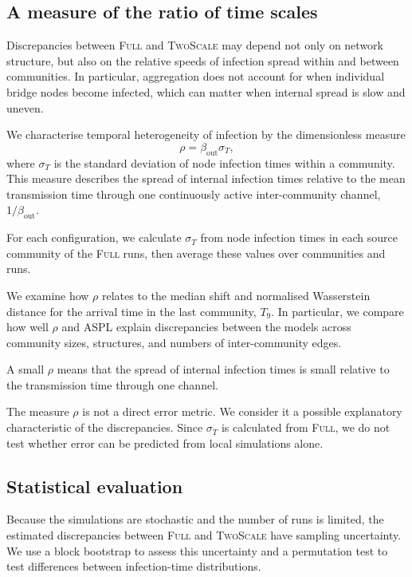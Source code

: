 \documentclass[a4paper,fleqn]{cas-sc}
\newcommand{\Full}{\textup{\textsc{Full}}}
\newcommand{\TS}{\textup{\textsc{TwoScale}}}
\begin{document}
\subsection{A measure of the ratio of time scales}
\label{sec:descriptor}

Discrepancies between \Full{} and \TS{} may depend not only on network structure, but also on the relative speeds of infection spread within and between communities. In particular, aggregation does not account for when individual bridge nodes become infected, which can matter when internal spread is slow and uneven.

We characterise temporal heterogeneity of infection by the dimensionless measure
\begin{equation}
\label{eq:rho}
\rho=\beta_{\mathrm{out}}\sigma_T,
\end{equation}
where $\sigma_T$ is the standard deviation of node infection times within a community. This measure describes the spread of internal infection times relative to the mean transmission time through one continuously active inter-community channel, $1/\beta_{\mathrm{out}}$.

For each configuration, we calculate $\sigma_T$ from node infection times in each source community of the \Full{} runs, then average these values over communities and runs.

We examine how $\rho$ relates to the median shift and normalised Wasserstein distance for the arrival time in the last community, $T_9$. In particular, we compare how well $\rho$ and ASPL explain discrepancies between the models across community sizes, structures, and numbers of inter-community edges.

A small $\rho$ means that the spread of internal infection times is small relative to the transmission time through one channel.

The measure $\rho$ is not a direct error metric. We consider it a possible explanatory characteristic of the discrepancies. Since $\sigma_T$ is calculated from \Full{}, we do not test whether error can be predicted from local simulations alone.

\subsection{Statistical evaluation}

Because the simulations are stochastic and the number of runs is limited, the estimated discrepancies between \Full{} and \TS{} have sampling uncertainty. We use a block bootstrap to assess this uncertainty and a permutation test to test differences between infection-time distributions.
\end{document}
